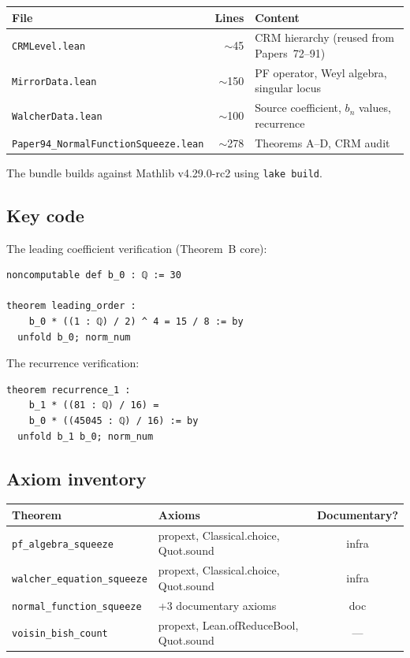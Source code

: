 \documentclass[11pt]{article}
\theoremstyle{plain}
\theoremstyle{definition}
\theoremstyle{remark}
\begin{document}
\begin{center}
\renewcommand{\arraystretch}{1.2}
\begin{tabular}{@{}lrl@{}}
\toprule
\textbf{File} & \textbf{Lines} & \textbf{Content} \\
\midrule
\texttt{CRMLevel.lean} & $\sim$45 & CRM hierarchy (reused from Papers~72--91) \\
\texttt{MirrorData.lean} & $\sim$150 & PF operator, Weyl algebra, singular locus \\
\texttt{WalcherData.lean} & $\sim$100 & Source coefficient, $b_n$ values, recurrence \\
\texttt{Paper94\_NormalFunctionSqueeze.lean} & $\sim$278 & Theorems A--D, CRM audit \\
\bottomrule
\end{tabular}
\end{center}

The bundle builds against Mathlib v4.29.0-rc2 using \texttt{lake build}.

\subsection{Key code}

The leading coefficient verification (Theorem~B core):

\begin{lstlisting}[style=leanstyle,caption={Walcher's disk count verified}]
noncomputable def b_0 : ℚ := 30

theorem leading_order :
    b_0 * ((1 : ℚ) / 2) ^ 4 = 15 / 8 := by
  unfold b_0; norm_num
\end{lstlisting}

The recurrence verification:

\begin{lstlisting}[style=leanstyle,caption={Recurrence at $n = 1$}]
theorem recurrence_1 :
    b_1 * ((81 : ℚ) / 16) =
    b_0 * ((45045 : ℚ) / 16) := by
  unfold b_1 b_0; norm_num
\end{lstlisting}

\subsection{Axiom inventory}

\begin{center}
\renewcommand{\arraystretch}{1.2}
\begin{tabular}{@{}llc@{}}
\toprule
\textbf{Theorem} & \textbf{Axioms} & \textbf{Documentary?} \\
\midrule
\texttt{pf\_algebra\_squeeze} & propext, Classical.choice, Quot.sound & infra \\
\texttt{walcher\_equation\_squeeze} & propext, Classical.choice, Quot.sound & infra \\
\texttt{normal\_function\_squeeze} & +3 documentary axioms & doc \\
\texttt{voisin\_bish\_count} & propext, Lean.ofReduceBool, Quot.sound & --- \\
\bottomrule
\end{tabular}
\end{center}
\end{document}
